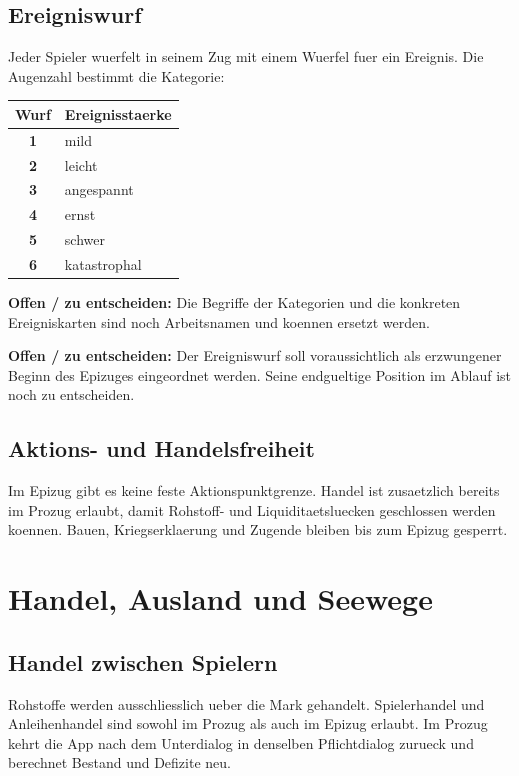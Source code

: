 \documentclass[11pt,a4paper,oneside,parskip=half]{scrreprt}
\newcommand{\offen}[1]{\begin{framed}\noindent\textbf{Offen / zu entscheiden:} #1\end{framed}}
\begin{document}
\section{Ereigniswurf}
Jeder Spieler wuerfelt in seinem Zug mit einem Wuerfel fuer ein Ereignis. Die Augenzahl bestimmt die Kategorie:

\begin{center}
\begin{tabular}{>{\bfseries}c l}
\toprule
Wurf & Ereignisstaerke \\
\midrule
1 & mild \\
2 & leicht \\
3 & angespannt \\
4 & ernst \\
5 & schwer \\
6 & katastrophal \\
\bottomrule
\end{tabular}
\end{center}

\offen{Die Begriffe der Kategorien und die konkreten Ereigniskarten sind noch Arbeitsnamen und koennen ersetzt werden.}

\offen{Der Ereigniswurf soll voraussichtlich als erzwungener Beginn des Epizuges eingeordnet werden. Seine endgueltige Position im Ablauf ist noch zu entscheiden.}

\section{Aktions- und Handelsfreiheit}
Im Epizug gibt es keine feste Aktionspunktgrenze. Handel ist zusaetzlich bereits im Prozug erlaubt, damit Rohstoff- und Liquiditaetsluecken geschlossen werden koennen. Bauen, Kriegserklaerung und Zugende bleiben bis zum Epizug gesperrt.

\chapter{Handel, Ausland und Seewege}

\section{Handel zwischen Spielern}
Rohstoffe werden ausschliesslich ueber die Mark gehandelt. Spielerhandel und Anleihenhandel sind sowohl im Prozug als auch im Epizug erlaubt. Im Prozug kehrt die App nach dem Unterdialog in denselben Pflichtdialog zurueck und berechnet Bestand und Defizite neu.
\end{document}
